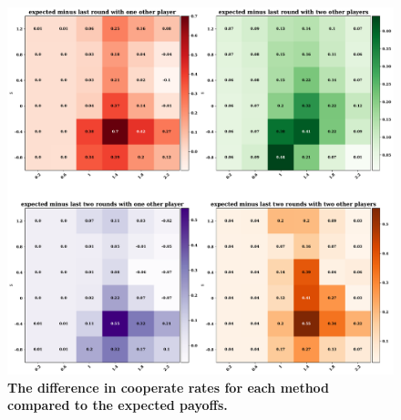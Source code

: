 \documentclass[11pt]{article}
\theoremstyle{plainCl1}
\theoremstyle{plainCl2}
\begin{document}
\begin{figure}[!htbp]
  \centering
  \includegraphics[width=\textwidth]{static/difference_in_cooperation.pdf}
  \caption{{\bf The difference in cooperate rates for each method compared to the
  expected payoffs.}}
\end{figure}



\end{document}
